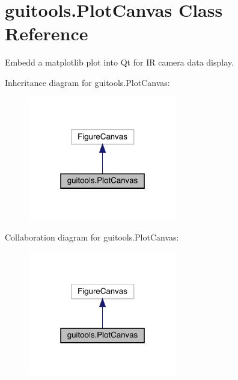 \hypertarget{classguitools_1_1_plot_canvas}{}\section{guitools.\+Plot\+Canvas Class Reference}
\label{classguitools_1_1_plot_canvas}


Embedd a matplotlib plot into Qt for IR camera data display.  




Inheritance diagram for guitools.\+Plot\+Canvas\+:\nopagebreak
\begin{figure}[H]
\begin{center}
\leavevmode
\includegraphics[width=184pt]{classguitools_1_1_plot_canvas__inherit__graph}
\end{center}
\end{figure}


Collaboration diagram for guitools.\+Plot\+Canvas\+:\nopagebreak
\begin{figure}[H]
\begin{center}
\leavevmode
\includegraphics[width=184pt]{classguitools_1_1_plot_canvas__coll__graph}
\end{center}
\end{figure}
